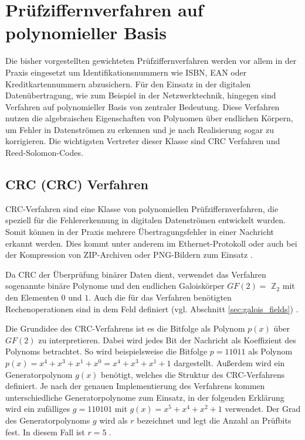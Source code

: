 
\chapter{Prüfziffernverfahren auf polynomieller Basis} \label{chap:polynomielle_verfahren}

Die bisher vorgestellten gewichteten Prüfziffernverfahren werden vor allem in der Praxis eingesetzt um Identifikationsnummern wie ISBN, EAN oder Kreditkartennummern abzusichern. Für den Einsatz in der digitalen Datenübertragung, wie zum Beispiel in der Netzwerktechnik, hingegen sind Verfahren auf polynomieller Basis von zentraler Bedeutung. Diese Verfahren nutzen die algebraischen Eigenschaften von Polynomen über endlichen Körpern, um Fehler in Datenströmen zu erkennen und je nach Realisierung sogar zu korrigieren. Die wichtigsten Vertreter dieser Klasse sind \ac{CRC} Verfahren und Reed-Solomon-Codes.

\section{\acl{CRC} (\acs{CRC}) Verfahren} \label{sec:crc_verfahren}
\ac{CRC}-Verfahren sind eine Klasse von polynomiellen Prüfziffernverfahren, die speziell für die Fehlererkennung in digitalen Datenströmen entwickelt wurden. Somit können in der Praxis mehrere Übertragungsfehler in einer Nachricht erkannt werden. Dies kommt unter anderem im Ethernet-Protokoll oder auch bei der Kompression von ZIP-Archiven oder PNG-Bildern zum Einsatz \cite{Springer_CRC}.

Da \ac{CRC} der Überprüfung binärer Daten dient, verwendet das Verfahren sogenannte binäre Polynome und den endlichen Galoiskörper \({GF}(2) = \) $\mathbb{Z}_2$ mit den Elementen \(0\) und \(1\). Auch die für das Verfahren benötigten Rechenoperationen sind in dem Feld definiert (vgl. Abschnitt \ref{sec:galois_fields}) \cite{Springer_CRC}.

Die Grundidee des \ac{CRC}-Verfahrens ist es die Bitfolge als Polynom \(p(x)\) über \({GF}(2)\) zu interpretieren. Dabei wird jedes Bit der Nachricht als Koeffizient des Polynoms betrachtet. So wird beispielsweise die Bitfolge \(p = 11011\) als Polynom \(p(x) = x^4 + x^3 + x^1 + x^0 = x^4 + x^3 + x^1 + 1\) dargestellt. Außerdem wird ein Generatorpolynom \(g(x)\) benötigt, welches die Struktur des \ac{CRC}-Verfahrens definiert. Je nach der genauen Implementierung des Verfahrens kommen unterschiedliche Generatorpolynome zum Einsatz, in der folgenden Erklärung wird ein zufälliges \(g = 110101\) mit \(g(x) = x^5 + x^4 + x^2 + 1\) verwendet. Der Grad des Generatorpolynoms \(g\) wird als \(r\) bezeichnet und legt die Anzahl an Prüfbits fest. In diesem Fall ist \(r = 5\) \cite{Springer_CRC}.

